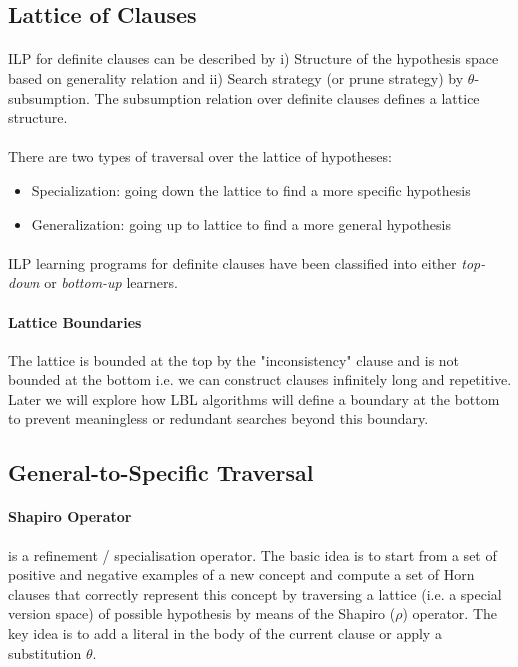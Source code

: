 \documentclass{article}
\theoremstyle{plain}
\theoremstyle{definition}
\begin{document}
\begin{multicols}{2}
\subsection{Lattice of Clauses}

\paragraph{} ILP for definite clauses can be described by i) Structure of the hypothesis space based on generality relation and ii) Search strategy (or prune strategy) by $\theta$-subsumption. The subsumption relation over definite clauses defines a lattice structure.

\paragraph{} There are two types of traversal over the lattice of hypotheses:

\begin{itemize}
\item Specialization: going down the lattice to find a more specific hypothesis
\item Generalization: going up to lattice to find a more general hypothesis
\end{itemize}

\paragraph{} ILP learning programs for definite clauses have been classified into either \textit{top-down} or \textit{bottom-up} learners.

\paragraph{Lattice Boundaries} The lattice is bounded at the top by the "inconsistency" clause and is not bounded at the bottom i.e. we can construct clauses infinitely long and repetitive. Later we will explore how LBL algorithms will define a boundary at the bottom to prevent meaningless or redundant searches beyond this boundary. 

\subsection{General-to-Specific Traversal}

\paragraph{Shapiro Operator} is a refinement / specialisation operator. The basic idea is to start from a set of positive and negative examples of a new concept and compute a set of Horn clauses that correctly represent this concept by traversing a lattice (i.e. a special version space) of possible hypothesis by means of the Shapiro ($\rho$) operator. The key idea is to add a literal in the body of the current clause or apply a substitution $\theta$.


\end{multicols}
\end{document}
